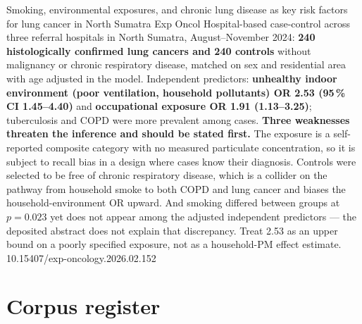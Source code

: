\documentclass[10pt]{article}
\begin{document}
{Smoking, environmental exposures, and chronic lung disease as key risk factors for lung cancer in North Sumatra}
{Exp Oncol}
{Hospital-based case-control across three referral hospitals in North Sumatra,
August--November 2024: \textbf{240 histologically confirmed lung cancers and 240 controls}
without malignancy or chronic respiratory disease, matched on sex and residential area
with age adjusted in the model. Independent predictors: \textbf{unhealthy indoor
environment (poor ventilation, household pollutants) OR 2.53 (95\,\% CI 1.45--4.40)} and
\textbf{occupational exposure OR 1.91 (1.13--3.25)}; tuberculosis and COPD were more
prevalent among cases. \textbf{Three weaknesses threaten the inference and should be
stated first.} The exposure is a self-reported composite category with no measured
particulate concentration, so it is subject to recall bias in a design where cases know
their diagnosis. Controls were selected to be free of chronic respiratory disease, which
is a collider on the pathway from household smoke to both COPD and lung cancer and biases
the household-environment OR upward. And smoking differed between groups at $p = 0.023$
yet does not appear among the adjusted independent predictors --- the deposited abstract
does not explain that discrepancy. Treat 2.53 as an upper bound on a poorly specified
exposure, not as a household-PM effect estimate.}
{10.15407/exp-oncology.2026.02.152}

\vspace{4mm}
\section*{\sffamily\bfseries\color{Deep}Corpus register}
\vspace{-1.5mm}{\color{Amber}\rule{\linewidth}{1.1pt}}\vspace{2.5mm}


\end{document}
